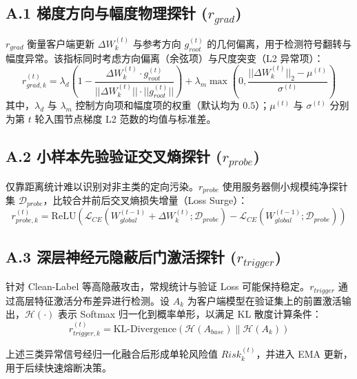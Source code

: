 \documentclass[11pt, a4paper, UTF8, fontset=fandol]{ctexart}
\begin{document}
\subsection{A.1 梯度方向与幅度物理探针 ($r_{grad}$)}
$r_{grad}$ 衡量客户端更新 $\Delta W_k^{(t)}$ 与参考方向 $g_{root}^{(t)}$ 的几何偏离，用于检测符号翻转与幅度异常。该指标同时考虑方向偏离（余弦项）与尺度突变（L2 异常项）：
\begin{equation}
    r_{grad, k}^{(t)} = \lambda_{d} \left(1 - \frac{\Delta W_k^{(t)} \cdot g_{root}^{(t)}}{||\Delta W_k^{(t)}|| \cdot ||g_{root}^{(t)}||}\right) + \lambda_{m} \max\left(0, \frac{||\Delta W_k^{(t)}||_2 - \mu^{(t)}}{\sigma^{(t)}}\right)
\end{equation}
其中，$\lambda_d$ 与 $\lambda_m$ 控制方向项和幅度项的权重（默认均为 $0.5$）；$\mu^{(t)}$ 与 $\sigma^{(t)}$ 分别为第 $t$ 轮入围节点梯度 L2 范数的均值与标准差。

\subsection{A.2 小样本先验验证交叉熵探针 ($r_{probe}$)}
仅靠距离统计难以识别对非主类的定向污染。$r_{probe}$ 使用服务器侧小规模纯净探针集 $\mathcal{D}_{probe}$，比较合并前后交叉熵损失增量（Loss Surge）：
\begin{equation}
    r_{probe, k}^{(t)} = \text{ReLU}\left( \mathcal{L}_{CE}(W_{global}^{(t-1)} + \Delta W_k^{(t)}; \mathcal{D}_{probe}) - \mathcal{L}_{CE}(W_{global}^{(t-1)}; \mathcal{D}_{probe}) \right)
\end{equation}

\subsection{A.3 深层神经元隐蔽后门激活探针 ($r_{trigger}$)}
针对 Clean-Label 等高隐蔽攻击，常规统计与验证 Loss 可能保持稳定。$r_{trigger}$ 通过高层特征激活分布差异进行检测。设 $A_k$ 为客户端模型在验证集上的前置激活输出，$\mathcal{H}(\cdot)$ 表示 Softmax 归一化到概率单形，以满足 KL 散度计算条件：
\begin{equation}
    r_{trigger, k}^{(t)} = \text{KL-Divergence}\left( \mathcal{H}(A_{base}) \| \mathcal{H}(A_k) \right)
\end{equation}

上述三类异常信号经归一化融合后形成单轮风险值 $Risk_{k}^{(t)}$，并进入 EMA 更新，用于后续快速熔断决策。
\end{document}
